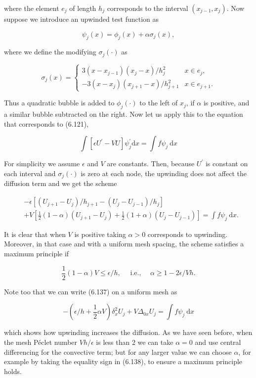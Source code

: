 \documentclass[10pt]{article}
\begin{document}
where the element \(e_{j}\) of length \(h_{j}\) corresponds to the interval \(\left(x_{j-1}, x_{j}\right)\). Now suppose we introduce an upwinded test function as

\[
\psi_{j}(x)=\phi_{j}(x)+\alpha \sigma_{j}(x),
\]

where we define the modifying \(\sigma_{j}(\cdot)\) as

\[
\sigma_{j}(x)= \begin{cases}3\left(x-x_{j-1}\right)\left(x_{j}-x\right) / h_{j}^{2} & x \in e_{j}, \\ -3\left(x-x_{j}\right)\left(x_{j+1}-x\right) / h_{j+1}^{2} & x \in e_{j+1} .\end{cases}
\]

Thus a quadratic bubble is added to \(\phi_{j}(\cdot)\) to the left of \(x_{j}\), if \(\alpha\) is positive, and a similar bubble subtracted on the right. Now let us apply this to the equation that corresponds to (6.121),

\[
\int\left[\epsilon U^{\prime}-V U\right] \psi_{j}^{\prime} \mathrm{d} x=\int f \psi_{j} \mathrm{~d} x
\]

For simplicity we assume \(\epsilon\) and \(V\) are constants. Then, because \(U^{\prime}\) is constant on each interval and \(\sigma_{j}(\cdot)\) is zero at each node, the upwinding does not affect the diffusion term and we get the scheme

\[
\begin{aligned}
& -\epsilon\left[\left(U_{j+1}-U_{j}\right) / h_{j+1}-\left(U_{j}-U_{j-1}\right) / h_{j}\right] \\
& +V\left[\frac{1}{2}(1-\alpha)\left(U_{j+1}-U_{j}\right)+\frac{1}{2}(1+\alpha)\left(U_{j}-U_{j-1}\right)\right]=\int f \psi_{j} \mathrm{~d} x .
\end{aligned}
\]

It is clear that when \(V\) is positive taking \(\alpha>0\) corresponds to upwinding. Moreover, in that case and with a uniform mesh spacing, the scheme satisfies a maximum principle if

\[
\frac{1}{2}(1-\alpha) V \leq \epsilon / h, \quad \text { i.e., } \quad \alpha \geq 1-2 \epsilon / V h .
\]

Note too that we can write (6.137) on a uniform mesh as

\[
-\left(\epsilon / h+\frac{1}{2} \alpha V\right) \delta_{x}^{2} U_{j}+V \Delta_{0 x} U_{j}=\int f \psi_{j} \mathrm{~d} x
\]

which shows how upwinding increases the diffusion. As we have seen before, when the mesh Péclet number \(V h / \epsilon\) is less than 2 we can take \(\alpha=0\) and use central differencing for the convective term; but for any larger value we can choose \(\alpha\), for example by taking the equality sign in (6.138), to ensure a maximum principle holds.
\end{document}
